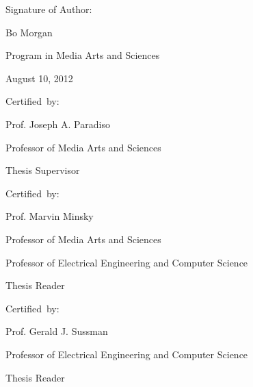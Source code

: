 \begin{addmargin}[-1cm]{-3cm}

\begin{flushright}
  \vspace{10mm}

  Signature of Author:\hspace{0.5cm}~\makebox[2.75in]{\hrulefill}

                                 Bo Morgan

                                 Program in Media Arts and Sciences
                                 
                                 August 10, 2012
                                 
  \vspace{5mm}
  
  Certified~by:\hspace{0.5cm}~\makebox[2.75in]{\hrulefill}

                                 Prof. Joseph A. Paradiso

                                 Professor of Media Arts and Sciences
                                 
                                 Thesis Supervisor

  \vspace{5mm}
  
  Certified~by:\hspace{0.5cm}~\makebox[2.75in]{\hrulefill}
  
                                 Prof. Marvin Minsky

                                 Professor of Media Arts and Sciences

                                 Professor of Electrical Engineering and Computer Science
                                 
                                 Thesis Reader

  \vspace{5mm}

  Certified~by:\hspace{0.5cm}~\makebox[2.75in]{\hrulefill}
  
                                 Prof. Gerald J. Sussman

                                 Professor of Electrical Engineering and Computer Science
                                 
                                 Thesis Reader


\end{flushright}
\end{addmargin}
